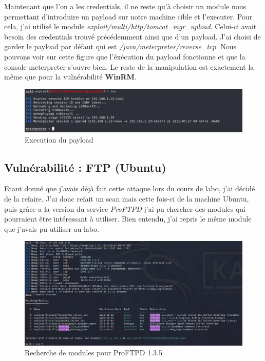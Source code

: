 \documentclass[a4paper]{article}
\begin{document}
Maintenant que l'on a les credentials, il ne reste qu'à choisir un module nous permettant d'introduire un payload sur notre machine cible et l'executer. Pour cela, j'ai utilisé le module 
\emph{exploit/multi/http/tomcat\_mgr\_upload}. Celui-ci avait besoin des credentials trouvé précédemment ainsi que d'un payload. J'ai choisi de garder le payload par défaut qui est \emph{/java/meterpreter/reverse\_tcp}.
Nous pouvons voir sur cette figure que l'éxécution du payload fonctionne et que la console meterpreter s'ouvre bien. Le reste de la manipulation est exactement la même que pour la vulnérabilité \textbf{WinRM}.

\begin{figure}[H]
  \centering
  \includegraphics[width=14cm]{images/Rapport/kali/W2k8/tomcat/meterpreter.png}
  \caption{Execution du payload}
\end{figure}

\subsection{Vulnérabilité : FTP (Ubuntu)}
Etant donné que j'avais déjà fait cette attaque lors du cours de labo, j'ai décidé de la refaire. J'ai donc refait un scan mais cette fois-ci de la machine Ubuntu, puis grâce a la version du service 
\emph{ProFTPD} j'ai pu chercher des modules qui pourraient être intéressant à utiliser. Bien entendu, j'ai repris le même module que j'avais pu utiliser au labo.

\begin{figure}[H]
  \centering
  \includegraphics[width=14cm]{images/Rapport/kali/ubuntu/ftp/1.png}
  \caption{Recherche de modules pour ProFTPD 1.3.5}
\end{figure}
\end{document}
